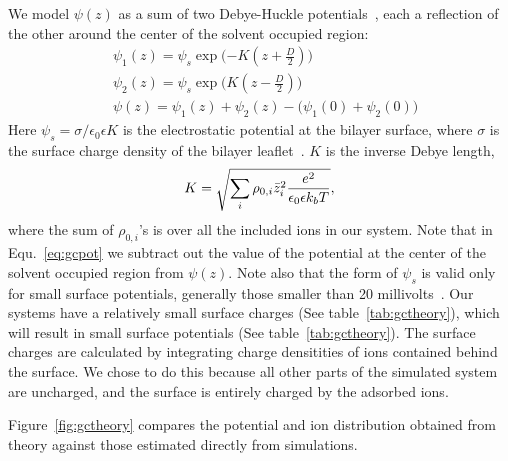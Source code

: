\documentclass[12pt,openany,final]{book}
\begin{document}
We model $\psi(z)$ as a sum of two Debye-Huckle 
potentials~\cite{israelachvili:2011:intermol}, each a reflection of the other around the center of the solvent occupied region:
\begin{align}
&\psi_{1}(z) = \psi_s \exp\bigg({-K(z+\frac{D}{2})}\bigg)\\
&\psi_{2}(z) = \psi_s \exp\bigg({K(z-\frac{D}{2})}\bigg)\\
\label{eq:gcpot}
&\psi(z) = \psi_1(z) + \psi_2(z) - \big({\psi_1(0)+\psi_2(0)}\big)
\end{align}
Here $\psi_s = \sigma/\epsilon_0\epsilon K$ is the electrostatic potential at the bilayer surface, where $\sigma$ 
is the surface charge density of the bilayer leaflet~\cite{israelachvili:2011:intermol}. $K$ is the inverse Debye length, 
\begin{equation}
\label{eq:debyelength}
K=\sqrt{\sum_{i} \rho_{0,i} \bar z_i^2\frac{\text{\si{\elementarycharge}}^2}{\epsilon_0 \epsilon k_bT}},
\end{equation}
where the sum of $\rho_{0,i}$'s is over all the included ions in our system. Note that in Equ.~\ref{eq:gcpot} we 
subtract out the value of the potential at the center of the solvent occupied region from $\psi(z)$. 
Note also that the form of $\psi_s$ is valid only for small surface potentials, generally those smaller than 
20 millivolts~\cite{israelachvili:2011:intermol}. Our systems have a relatively small surface charges 
(See table~\ref{tab:gctheory}), 
which will result in small surface potentials (See table~\ref{tab:gctheory}). 
The surface charges are calculated by integrating 
charge densitities of ions contained behind the surface. We chose to do this because all other parts of 
the simulated system are uncharged, and the surface is entirely charged by the adsorbed ions.

Figure~\ref{fig:gctheory} compares the potential and ion distribution 
obtained from theory against those estimated directly from simulations. 
\end{document}
